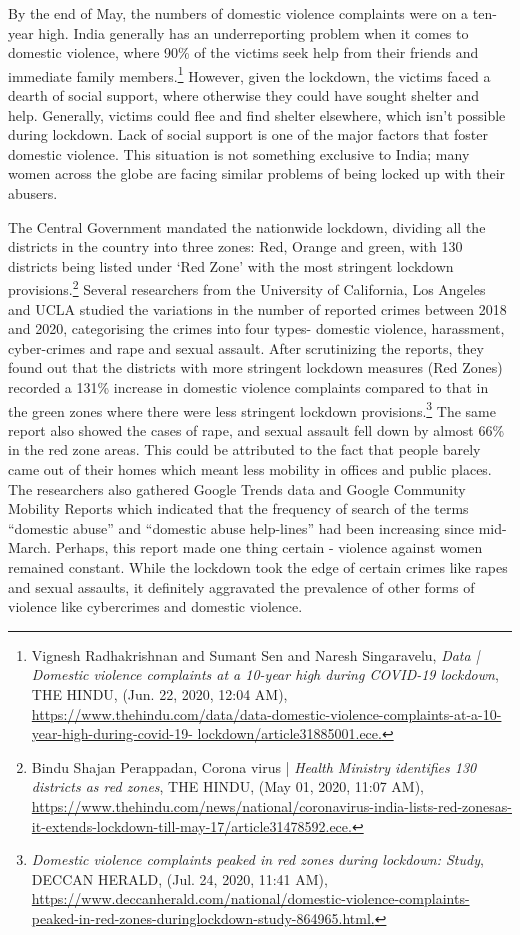 \begin{multicols}{2}
\noi 
By the end of May, the numbers of domestic violence complaints were on a ten-year high.
India generally has an underreporting problem when it comes to domestic violence, where
90\% of the victims seek help from their friends and immediate family members.\footnote{Vignesh Radhakrishnan and Sumant Sen and Naresh Singaravelu, \textit{Data | Domestic violence complaints at a
10-year high during COVID-19 lockdown}, THE HINDU, (Jun. 22, 2020, 12:04 AM),
\url{https://www.thehindu.com/data/data-domestic-violence-complaints-at-a-10-year-high-during-covid-19-
lockdown/article31885001.ece.}} However,
given the lockdown, the victims faced a dearth of social support, where otherwise they could
have sought shelter and help. Generally, victims could flee and find shelter elsewhere, which
isn’t possible during lockdown. Lack of social support is one of the major factors that foster
domestic violence. This situation is not something exclusive to India; many women across the
globe are facing similar problems of being locked up with their abusers. 


\noi
The Central Government mandated the nationwide lockdown, dividing all the districts in the
country into three zones: Red, Orange and green, with 130 districts being listed under ‘Red
Zone’ with the most stringent lockdown provisions.\footnote{Bindu Shajan Perappadan, Corona virus | \textit{Health Ministry identifies 130 districts as red zones}, THE HINDU,
(May 01, 2020, 11:07 AM), \url{https://www.thehindu.com/news/national/coronavirus-india-lists-red-zonesas-it-extends-lockdown-till-may-17/article31478592.ece.}} Several researchers from the University
of California, Los Angeles and UCLA studied the variations in the number of reported crimes
between 2018 and 2020, categorising the crimes into four types- domestic violence,
harassment, cyber-crimes and rape and sexual assault. After scrutinizing the reports, they
found out that the districts with more stringent lockdown measures (Red Zones) recorded a
131\% increase in domestic violence complaints compared to that in the green zones where
there were less stringent lockdown provisions.\footnote{\textit{Domestic violence complaints peaked in red zones during lockdown: Study}, DECCAN HERALD, (Jul. 24, 2020,
11:41 AM), \url{https://www.deccanherald.com/national/domestic-violence-complaints-peaked-in-red-zones-duringlockdown-study-864965.html.}} The same report also showed the cases of
rape, and sexual assault fell down by almost 66\% in the red zone areas. This could be attributed to the fact that people barely came out of their homes which meant less mobility in
offices and public places. The researchers also gathered Google Trends data and Google
Community Mobility Reports which indicated that the frequency of search of the terms
“domestic abuse” and “domestic abuse help-lines” had been increasing since mid-March.
Perhaps, this report made one thing certain - violence against women remained constant.
While the lockdown took the edge of certain crimes like rapes and sexual assaults, it
definitely aggravated the prevalence of other forms of violence like cybercrimes and
domestic violence.


\end{multicols}
